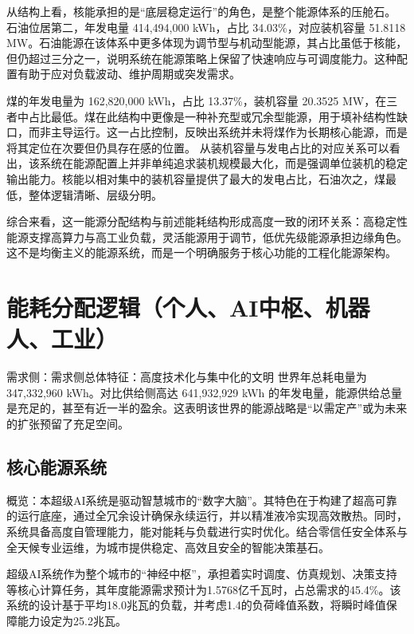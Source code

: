 从结构上看，核能承担的是``底层稳定运行''的角色，是整个能源体系的压舱石。 石油位居第二，年发电量 414,494,000 kWh，占比 34.03\%，对应装机容量 51.8118 MW。石油能源在该体系中更多体现为调节型与机动型能源，其占比虽低于核能，但仍超过三分之一，说明系统在能源策略上保留了快速响应与可调度能力。这种配置有助于应对负载波动、维护周期或突发需求。

煤的年发电量为 162,820,000 kWh，占比 13.37\%，装机容量 20.3525 MW，在三者中占比最低。煤在此结构中更像是一种补充型或冗余型能源，用于填补结构性缺口，而非主导运行。这一占比控制，反映出系统并未将煤作为长期核心能源，而是将其定位在次要但仍具存在感的位置。 从装机容量与发电占比的对应关系可以看出，该系统在能源配置上并非单纯追求装机规模最大化，而是强调单位装机的稳定输出能力。核能以相对集中的装机容量提供了最大的发电占比，石油次之，煤最低，整体逻辑清晰、层级分明。

综合来看，这一能源分配结构与前述能耗结构形成高度一致的闭环关系：高稳定性能源支撑高算力与高工业负载，灵活能源用于调节，低优先级能源承担边缘角色。这不是均衡主义的能源系统，而是一个明确服务于核心功能的工程化能源架构。

\section{能耗分配逻辑（个人、AI中枢、机器人、工业）}\label{ux80fdux8017ux5206ux914dux903bux8f91ux4e2aux4ebaaiux4e2dux67a2ux673aux5668ux4ebaux5de5ux4e1a}

需求侧：需求侧总体特征：高度技术化与集中化的文明 世界年总耗电量为 347,332,960 kWh。对比供给侧高达 641,932,929 kWh 的年发电量，能源供给总量是充足的，甚至有近一半的盈余。这表明该世界的能源战略是``以需定产''或为未来的扩张预留了充足空间。

\subsection{核心能源系统}\label{ux6838ux5fc3ux80fdux6e90ux7cfbux7edf}

概览：本超级AI系统是驱动智慧城市的``数字大脑''。其特色在于构建了超高可靠的运行底座，通过全冗余设计确保永续运行，并以精准液冷实现高效散热。同时，系统具备高度自管理能力，能对能耗与负载进行实时优化。结合零信任安全体系与全天候专业运维，为城市提供稳定、高效且安全的智能决策基石。

超级AI系统作为整个城市的``神经中枢''，承担着实时调度、仿真规划、决策支持等核心计算任务，其年度能源需求预计为1.5768亿千瓦时，占总需求的45.4\%。该系统的设计基于平均18.0兆瓦的负载，并考虑1.4的负荷峰值系数，将瞬时峰值保障能力设定为25.2兆瓦。


